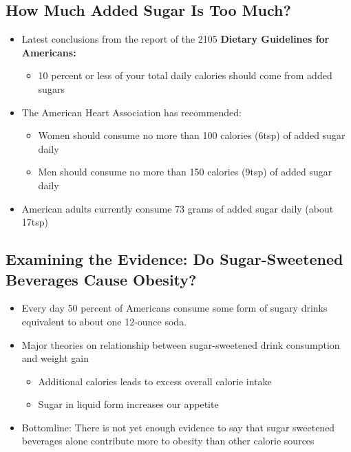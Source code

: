 \documentclass[12pt]{article}
\begin{document}
        \subsection{How Much Added Sugar Is Too Much?}
            \begin{itemize}
                \item Latest conclusions from the report of the 2105 \textbf{Dietary Guidelines for Americans:}
                    \begin{itemize}
                        \item 10 percent or less of your total daily calories should come from added sugars
                    \end{itemize}
                \item The American Heart Association has recommended:
                    \begin{itemize}
                        \item Women should consume no more than 100 calories (6tsp) of added sugar daily
                        \item Men should consume no more than 150 calories (9tsp) of added sugar daily
                    \end{itemize}
                \item American adults currently consume 73 grams of added sugar daily (about 17tsp)
            \end{itemize}

        \subsection{Examining the Evidence: Do Sugar-Sweetened Beverages Cause Obesity?}
            \begin{itemize}
                \item Every day 50 percent of Americans consume some form of sugary drinks equivalent to about one 12-ounce soda.
                \item Major theories on relationship between sugar-sweetened drink consumption and weight gain
                    \begin{itemize}
                        \item Additional calories leads to excess overall calorie intake
                        \item Sugar in liquid form increases our appetite
                    \end{itemize}
                \item Bottomline: There is not yet enough evidence to say that sugar sweetened beverages alone contribute more to obesity than other calorie sources
            \end{itemize}
\end{document}
